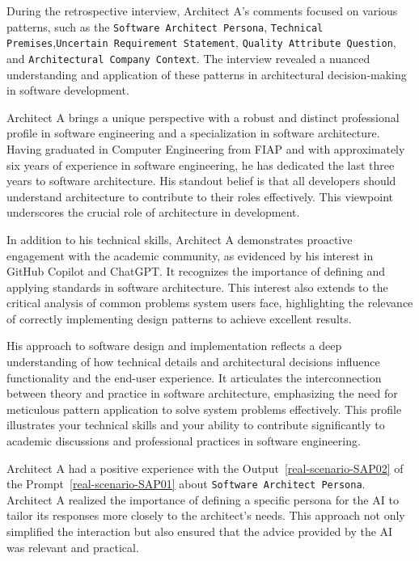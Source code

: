 
During the retrospective interview, Architect A's comments focused on various patterns, such as the \texttt{Software Architect Persona}, \texttt{Technical Premises},\texttt{Uncertain Requirement Statement}, \texttt{Quality Attribute Question}, and \texttt{Architectural Company Context}. The interview revealed a nuanced understanding and application of these patterns in architectural decision-making in software development.

Architect A brings a unique perspective with a robust and distinct professional profile in software engineering and a specialization in software architecture. Having graduated in Computer Engineering from FIAP and with approximately six years of experience in software engineering, he has dedicated the last three years to software architecture. His standout belief is that all developers should understand architecture to contribute to their roles effectively. This viewpoint underscores the crucial role of architecture in development.

In addition to his technical skills, Architect A demonstrates proactive engagement with the academic community, as evidenced by his interest in GitHub Copilot and ChatGPT. It recognizes the importance of defining and applying standards in software architecture. This interest also extends to the critical analysis of common problems system users face, highlighting the relevance of correctly implementing design patterns to achieve excellent results.

His approach to software design and implementation reflects a deep understanding of how technical details and architectural decisions influence functionality and the end-user experience. It articulates the interconnection between theory and practice in software architecture, emphasizing the need for meticulous pattern application to solve system problems effectively. This profile illustrates your technical skills and your ability to contribute significantly to academic discussions and professional practices in software engineering.



Architect A had a positive experience with the Output~\ref{real-scenario-SAP02} of the Prompt~\ref{real-scenario-SAP01} about \texttt{Software Architect Persona}. Architect A realized the importance of defining a specific persona for the AI to tailor its responses more closely to the architect's needs. This approach not only simplified the interaction but also ensured that the advice provided by the AI was relevant and practical. 

